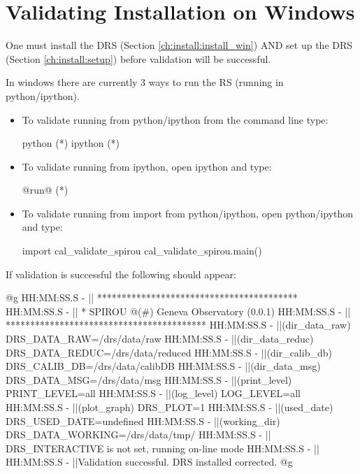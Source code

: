 \clearpage
\newpage
\section{Validating Installation on Windows}
\label{ch:install:validating_installwin}

\begin{note}
One must install the DRS (Section \ref{ch:install:install_win}) AND set up the DRS (Section \ref{ch:install:setup}) before validation will be successful.
\end{note}

\noindent In windows there are currently 3 ways to run the RS (running in python/ipython).

\begin{itemize}
\item To validate running from python/ipython from the command line type:
\begin{cmdbox}
python (*\calvalidate*)
ipython (*\calvalidate*)
\end{cmdbox}

\item To validate running from ipython, open ipython and type:
\begin{pythonbox}
@run@ (*\calvalidate*)
\end{pythonbox}

\item To validate running from import from python/ipython, open python/ipython and type:
\begin{pythonbox}
import cal_validate_spirou
cal_validate_spirou.main()
\end{pythonbox}

\end{itemize}

\noindent If validation is successful the following should appear:
\begin{cmdboxprintspecial}
@g
HH:MM:SS.S -   || *****************************************
HH:MM:SS.S -   || * SPIROU @(#) Geneva Observatory (0.0.1)
HH:MM:SS.S -   || *****************************************
HH:MM:SS.S -   ||(dir_data_raw)      DRS_DATA_RAW=/drs/data/raw
HH:MM:SS.S -   ||(dir_data_reduc)    DRS_DATA_REDUC=/drs/data/reduced
HH:MM:SS.S -   ||(dir_calib_db)      DRS_CALIB_DB=/drs/data/calibDB
HH:MM:SS.S -   ||(dir_data_msg)      DRS_DATA_MSG=/drs/data/msg
HH:MM:SS.S -   ||(print_level)       PRINT_LEVEL=all         %
HH:MM:SS.S -   ||(log_level)         LOG_LEVEL=all         %
HH:MM:SS.S -   ||(plot_graph)        DRS_PLOT=1            %
HH:MM:SS.S -   ||(used_date)         DRS_USED_DATE=undefined
HH:MM:SS.S -   ||(working_dir)       DRS_DATA_WORKING=/drs/data/tmp/
HH:MM:SS.S -   ||                    DRS_INTERACTIVE is not set, running on-line mode
HH:MM:SS.S -   ||
HH:MM:SS.S -   ||Validation successful. DRS installed corrected.
@g
\end{cmdboxprintspecial}